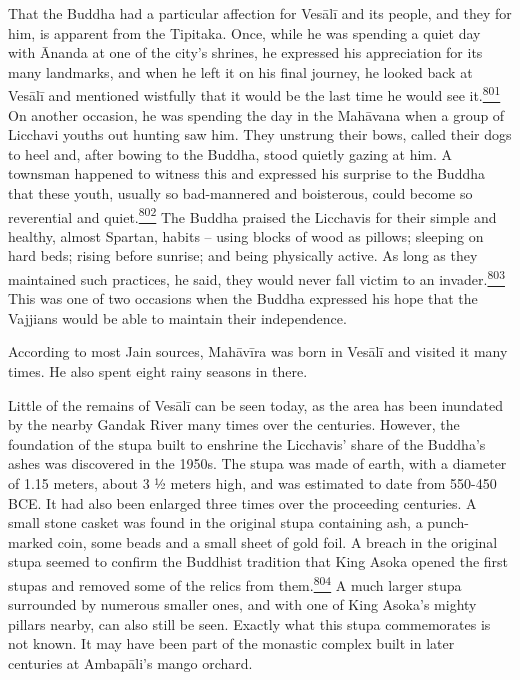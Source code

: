 \begin{description}
That the Buddha had a particular affection for Vesālī and its people,
and they for him, is apparent from the Tipitaka. Once, while he was
spending a quiet day with Ānanda at one of the city's shrines, he
expressed his appreciation for its many landmarks, and when he left it
on his final journey, he looked back at Vesālī and mentioned wistfully
that it would be the last time he would see
it.\label{footprints_split_019.html_fnref801}\hyperref[footprints_split_025.htmlux5cux23fn801]{\textsuperscript{801}}
On another occasion, he was spending the day in the Mahāvana when a
group of Licchavi youths out hunting saw him. They unstrung their bows,
called their dogs to heel and, after bowing to the Buddha, stood quietly
gazing at him. A townsman happened to witness this and expressed his
surprise to the Buddha that these youth, usually so bad-mannered and
boisterous, could become so reverential and
quiet.\label{footprints_split_019.html_fnref802}\hyperref[footprints_split_025.htmlux5cux23fn802]{\textsuperscript{802}}
The Buddha praised the Licchavis for their simple and healthy, almost
Spartan, habits -- using blocks of wood as pillows; sleeping on hard
beds; rising before sunrise; and being physically active. As long as
they maintained such practices, he said, they would never fall victim to
an
invader.\label{footprints_split_019.html_fnref803}\hyperref[footprints_split_025.htmlux5cux23fn803]{\textsuperscript{803}}
This was one of two occasions when the Buddha expressed his hope that
the Vajjians would be able to maintain their independence.

According to most Jain sources, Mahāvīra was born in Vesālī and visited
it many times. He also spent eight rainy seasons in there.

Little of the remains of Vesālī can be seen today, as the area has been
inundated by the nearby Gandak River many times over the centuries.
However, the foundation of the stupa built to enshrine the Licchavis'
share of the Buddha's ashes was discovered in the 1950s. The stupa was
made of earth, with a diameter of 1.15 meters, about 3 ½ meters high,
and was estimated to date from 550-450 BCE. It had also been enlarged
three times over the proceeding centuries. A small stone casket was
found in the original stupa containing ash, a punch-marked coin, some
beads and a small sheet of gold foil. A breach in the original stupa
seemed to confirm the Buddhist tradition that King Asoka opened the
first stupas and removed some of the relics from
them.\label{footprints_split_019.html_fnref804}\hyperref[footprints_split_025.htmlux5cux23fn804]{\textsuperscript{804}}
A much larger stupa surrounded by numerous smaller ones, and with one of
King Asoka's mighty pillars nearby, can also still be seen. Exactly what
this stupa commemorates is not known. It may have been part of the
monastic complex built in later centuries at Ambapāli's mango orchard.
\end{description}

